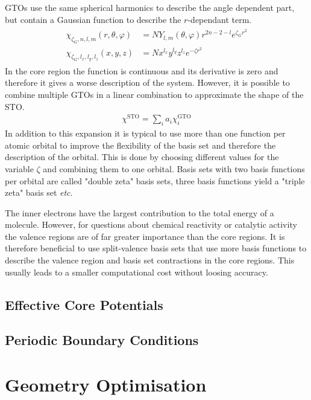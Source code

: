 \acp{GTO} use the same spherical harmonics to describe the angle dependent
part, but contain a Gaussian function to describe the $r$-dependant term.
%
\begin{align}
    \begin{aligned}
    \chi_{\zeta_G,n,l,m}(r,\theta,\varphi) &= NY_{l,m}(\theta,\varphi)r^{2n-2-l}e^{\zeta_Gr^2}\\
    \chi_{\zeta_G,l_x,l_y,l_z}(x,y,z) &= N x^{l_x}y^{l_y}z^{l_z}e^{-\zeta r^2}
    \end{aligned}
\end{align}
%
In the core region the function is continuous and its derivative is zero and
therefore it gives a worse description of the system. However, it is possible
to combine multiple \acp{GTO} in a linear combination to approximate the shape
of the \ac{STO}.
%
\begin{align}
    \chi^\text{STO} = \sum_ia_i\chi_i^\text{GTO}
\end{align}
%
In addition to this expansion it is typical to use more than one
function per atomic orbital to improve the flexibility of the basis set and
therefore the description of the orbital. This is done by choosing different
values for the variable $\zeta$ and combining them to one orbital. Basis sets
with two basis functions per orbital are called "double zeta" basis sets, three
basis functions yield a "triple zeta" basis set \textit{etc}.

The inner electrons have the largest contribution to the total energy of a
molecule. However, for questions about chemical reactivity or catalytic
activity the valence regions are of far greater importance than the core
regions. It is therefore beneficial to use split-valence basis sets that use
more basis functions to describe the valence region and basis set contractions
in the core regions. This usually leads to a smaller computational cost without
loosing accuracy. 

\section{Effective Core Potentials}
\label{sec:ECP}

\section{Periodic Boundary Conditions}
\label{sec:PBC}

\chapter{Geometry Optimisation}
\label{sec:geometryoptimisation}

